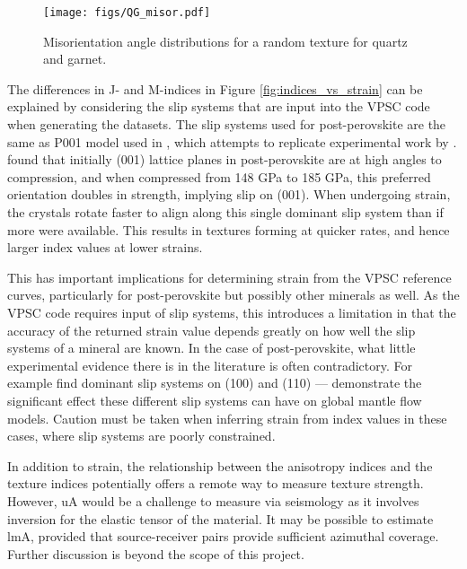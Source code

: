 \documentclass[a4paper,12pt,twoside]{report}
\numberwithin{equation}{chapter}
\begin{document}
\begin{figure}[h!]
  \centering
    \texttt{[image: figs/QG\_misor.pdf]}
  \caption[Garnet misorientation angle distribution]{Misorientation angle distributions for a random texture for quartz and garnet.} 
  \label{fig:garnet}
\end{figure} 

The differences in J- and M-indices in Figure \ref{fig:indices_vs_strain} can be explained by considering the slip systems that are input into the VPSC code when generating the datasets. The slip systems used for post-perovskite are the same as P001 model used in \cite{Walker2012}, which attempts to replicate experimental work by \citep{Miyagi2010}. \cite{Miyagi2010} found that initially (001) lattice planes in post-perovskite are at high angles to compression, and when compressed from 148 GPa to 185 GPa, this preferred orientation doubles in strength, implying slip on (001). When undergoing strain, the crystals rotate faster to align along this single dominant slip system than if more were available. This results in textures forming at quicker rates, and hence larger index values at lower strains.

This has important implications for determining strain from the VPSC reference curves, particularly for post-perovskite but possibly other minerals as well. As the VPSC code requires input of slip systems, this introduces a limitation in that the accuracy of the returned strain value depends greatly on how well the slip systems of a mineral are known. In the case of post-perovskite, what little experimental evidence there is in the literature is often contradictory. For example \cite{Merkel2007} find dominant slip systems on (100) and (110) --- \cite{Walker2012} demonstrate the significant effect these different slip systems can have on global mantle flow models. Caution must be taken when inferring strain from index values in these cases, where slip systems are poorly constrained.

In addition to strain, the relationship between the anisotropy indices and the texture indices potentially offers a remote way to measure texture strength. However, uA would be a challenge to measure via seismology as it involves inversion for the elastic tensor of the material. It may be possible to estimate lmA, provided that source-receiver pairs provide sufficient azimuthal coverage. Further discussion is beyond the scope of this project.   
  
\end{document}
